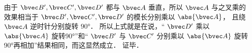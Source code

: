 由于 $\bvec B', \bvec C', \bvec D'$ 都与 $\bvec A$ 垂直，所以 $\bvec A$ 与之叉乘的效果相当于 $\bvec B', \bvec C', \bvec D'$ 的模长分别乘以 $\abs {\bvec A}$， 且绕 $\bvec A$ 逆时针分别旋转 $90°$． 所以上式就是在说，“ $\bvec D'$ 乘以 $\abs{\bvec A} $ 旋转90°”和“ $\bvec B'$ 与 $\bvec C'$ 分别乘以 $\abs{\bvec A}$ 旋转90°再相加”结果相同，而这显然成立． 证毕．




















